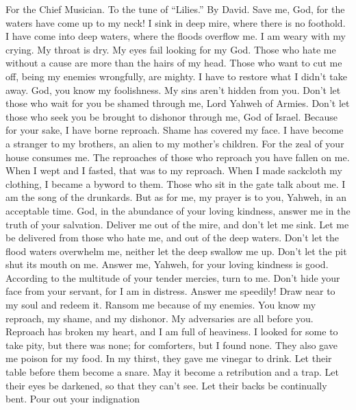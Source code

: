 For the Chief Musician. To the tune of ``Lilies.'' By David.
 Save me, God, for the waters have come up to my neck!
 I sink in deep mire, where there is no foothold. I have
come into deep waters, where the floods overflow me.  I am
weary with my crying. My throat is dry. My eyes fail looking for my God.
 Those who hate me without a cause are more than the hairs
of my head. Those who want to cut me off, being my enemies wrongfully,
are mighty. I have to restore what I didn't take away.  God,
you know my foolishness. My sins aren't hidden from you. 
Don't let those who wait for you be shamed through me, Lord Yahweh of
Armies. Don't let those who seek you be brought to dishonor through me,
God of Israel.  Because for your sake, I have borne
reproach. Shame has covered my face.  I have become a
stranger to my brothers, an alien to my mother's children. 
For the zeal of your house consumes me. The reproaches of those who
reproach you have fallen on me.  When I wept and I fasted,
that was to my reproach.  When I made sackcloth my
clothing, I became a byword to them.  Those who sit in the
gate talk about me. I am the song of the drunkards.  But as
for me, my prayer is to you, Yahweh, in an acceptable time. God, in the
abundance of your loving kindness, answer me in the truth of your
salvation.  Deliver me out of the mire, and don't let me
sink. Let me be delivered from those who hate me, and out of the deep
waters.  Don't let the flood waters overwhelm me, neither
let the deep swallow me up. Don't let the pit shut its mouth on me.
 Answer me, Yahweh, for your loving kindness is good.
According to the multitude of your tender mercies, turn to me.
 Don't hide your face from your servant, for I am in
distress. Answer me speedily!  Draw near to my soul and
redeem it. Ransom me because of my enemies.  You know my
reproach, my shame, and my dishonor. My adversaries are all before you.
 Reproach has broken my heart, and I am full of heaviness.
I looked for some to take pity, but there was none; for comforters, but
I found none.  They also gave me poison for my food. In my
thirst, they gave me vinegar to drink.  Let their table
before them become a snare. May it become a retribution and a trap.
 Let their eyes be darkened, so that they can't see. Let
their backs be continually bent.  Pour out your indignation
